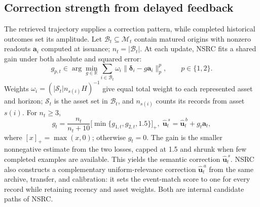 \documentclass{article}
\begin{document}
\subsection{Correction strength from delayed feedback}
The retrieved trajectory supplies a correction pattern, while completed historical outcomes set its amplitude. Let $\mathcal B_t\subseteq\mathcal M_t$ contain matured origins with nonzero readouts $\mathbf a_i$ computed at issuance; $n_t=|\mathcal B_t|$. At each update, NSRC fits a shared gain under both absolute and squared error:
\begin{equation}
g_{p,t}\in\arg\min_{g\in\mathbb R}
 \sum_{i\in\mathcal B_t}\omega_i
 \|\boldsymbol\delta_i-g\mathbf a_i\|_p^p,
 \qquad p\in\{1,2\}.
\label{eq:calibration_objective}
\end{equation}
Weights $\omega_i=(|\mathcal S_t|n_{s(i)}H)^{-1}$ give equal total weight to each represented asset and horizon; $\mathcal S_t$ is the asset set in $\mathcal B_t$, and $n_{s(i)}$ counts its records from asset $s(i)$. For $n_t\ge3$,
\begin{equation}
g_t=\frac{n_t}{n_t+10}\big[\min\{g_{1,t},g_{2,t},1.5\}\big]_+,\;\hat{\mathbf u}^{\,s}_t=\hat{\mathbf u}^{\,b}_t+g_t\mathbf a_t,
\label{eq:final}
\end{equation}
where $[x]_+=\max(x,0)$; otherwise $g_t=0$. The gain is the smaller nonnegative estimate from the two losses, capped at 1.5 and shrunk when few completed examples are available. This yields the semantic correction $\hat{\mathbf u}^{\,s}_t$. NSRC also constructs a complementary uniform-relevance correction $\hat{\mathbf u}^{\,a}_t$ from the same archive, transfer, and calibration: it sets the event-match score to one for every record while retaining recency and asset weights. Both are internal candidate paths of NSRC.
\end{document}
